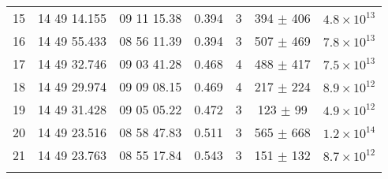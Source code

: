 \begin{table}[p]
\begin{center}
\begin{tabular}{rcccccc}
15 & 14 49 14.155  & 09 11 15.38  & 0.394  & 3  & 394 $\pm$ 406 & $4.8 \times 10^{13}$ \\
16 & 14 49 55.433  & 08 56 11.39  & 0.394  & 3  & 507 $\pm$ 469 & $7.8 \times 10^{13}$ \\
17 & 14 49 32.746  & 09 03 41.28  & 0.468  & 4  & 488 $\pm$ 417 & $7.5 \times 10^{13}$ \\
18 & 14 49 29.974  & 09 09 08.15  & 0.469  & 4  & 217 $\pm$ 224 & $8.9 \times 10^{12}$ \\
19 & 14 49 31.428  & 09 05 05.22  & 0.472  & 3  & 123 $\pm$  99 & $4.9 \times 10^{12}$ \\
20 & 14 49 23.516  & 08 58 47.83  & 0.511  & 3  & 565 $\pm$ 668 & $1.2 \times 10^{14}$ \\
21 & 14 49 23.763  & 08 55 17.84  & 0.543  & 3  & 151 $\pm$ 132 & $8.7 \times 10^{12}$ \\
\label{groups_ta:21Groups}
\end{tabular}
\vspace{-0.4cm}
\end{center}
\end{table}


